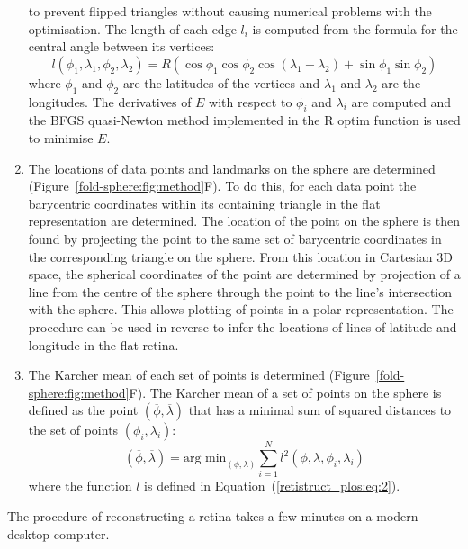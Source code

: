 \documentclass[10pt]{article}
\begin{document}
\begin{enumerate}
  to prevent flipped triangles without causing numerical problems with
  the optimisation. The length of each edge $l_i$ is computed from the
  formula for the central angle between its vertices:
  \begin{equation}
    \label{retistruct_plos:eq:2}
    l(\phi_1, \lambda_1, \phi_2, \lambda_2) =
    R(\cos\phi_1\cos\phi_2\cos(\lambda_1-\lambda_2) +
    \sin\phi_1\sin\phi_2)
  \end{equation}
  where $\phi_1$ and $\phi_2$ are the latitudes of the vertices and
  $\lambda_1$ and $\lambda_2$ are the longitudes.  The derivatives of
  $E$ with respect to $\phi_i$ and $\lambda_i$ are computed and the
  BFGS quasi-Newton method implemented in the R optim function is used
  to minimise $E$.
\item The locations of data points and landmarks on the sphere are
  determined (Figure~\ref{fold-sphere:fig:method}F). To do this, for
  each data point the barycentric coordinates within its containing
  triangle in the flat representation are determined.  The location of
  the point on the sphere is then found by projecting the point to the
  same set of barycentric coordinates in the corresponding triangle on
  the sphere. From this location in Cartesian 3D space, the spherical
  coordinates of the point are determined by projection of a line from
  the centre of the sphere through the point to the line's
  intersection with the sphere. This allows plotting of points in a
  polar representation. The procedure can be used in reverse to infer
  the locations of lines of latitude and longitude in the flat retina.
\item The Karcher mean of each set of points is determined
  (Figure~\ref{fold-sphere:fig:method}F). The Karcher mean of a set of
  points on the sphere \cite{Karc77riem,HeoSmal06form} is defined as
  the point $(\overline{\phi}, \overline{\lambda})$ that has a minimal
  sum of squared distances to the set of points $(\phi_i, \lambda_i)$:
  \begin{equation}
    \label{retistruct_plos:eq:3}
    (\overline{\phi}, \overline{\lambda}) = \mbox{arg min}_{(\phi,
      \lambda)} \sum_{i=1}^N l^2(\phi, \lambda, \phi_i, \lambda_i)
  \end{equation}
  where the function $l$ is defined in
  Equation~(\ref{retistruct_plos:eq:2}).
\end{enumerate}

The procedure of reconstructing a retina takes a few minutes on a
modern desktop computer.
\end{document}
